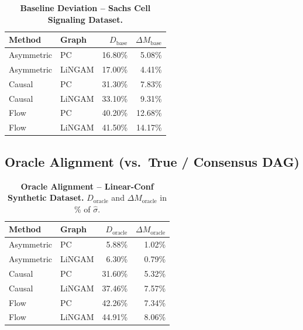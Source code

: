 \documentclass[12pt,letterpaper,twocolumn]{article}
\begin{document}
\begin{table}[H]
  \centering
  \caption{\textbf{Baseline Deviation -- Sachs Cell Signaling Dataset.}}
  \label{tab:baseline_sachs}
  \begin{tabular}{llrr}
    \toprule
    \textbf{Method} & \textbf{Graph} & $D_{\text{base}}$ & $\Delta M_{\text{base}}$ \\
    \midrule
    Asymmetric & PC     & 16.80\% & 5.08\%  \\
    Asymmetric & LiNGAM & 17.00\% & 4.41\%  \\
    Causal     & PC     & 31.30\% & 7.83\%  \\
    Causal     & LiNGAM & 33.10\% & 9.31\%  \\
    Flow       & PC     & 40.20\% & 12.68\% \\
    Flow       & LiNGAM & 41.50\% & 14.17\% \\
    \bottomrule
  \end{tabular}
\end{table}

\subsection{Oracle Alignment (vs.\ True / Consensus DAG)}

\begin{table}[H]
  \centering
  \caption{\textbf{Oracle Alignment -- Linear-Conf Synthetic Dataset.}
  $D_{\text{oracle}}$ and $\Delta M_{\text{oracle}}$ in \% of $\hat{\sigma}$.}
  \label{tab:oracle_synth}
  \begin{tabular}{llrr}
    \toprule
    \textbf{Method} & \textbf{Graph} & $D_{\text{oracle}}$ & $\Delta M_{\text{oracle}}$ \\
    \midrule
    Asymmetric & PC     & 5.88\%  & 1.02\% \\
    Asymmetric & LiNGAM & 6.30\%  & 0.79\% \\
    Causal     & PC     & 31.60\% & 5.32\% \\
    Causal     & LiNGAM & 37.46\% & 7.57\% \\
    Flow       & PC     & 42.26\% & 7.34\% \\
    Flow       & LiNGAM & 44.91\% & 8.06\% \\
    \bottomrule
  \end{tabular}
\end{table}
\end{document}
